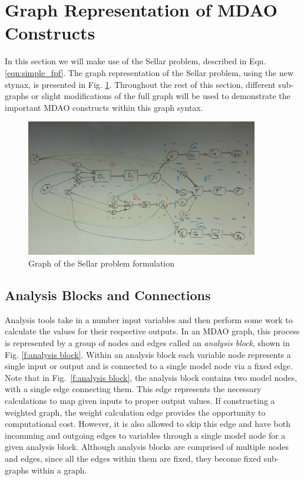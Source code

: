 \section{Graph Representation of MDAO Constructs}
\label{s:graph representation}
In this section we will make use of the Sellar problem, described in 
Eqn. \ref{eqn:simple_fpf}. The graph representation of the Sellar problem, 
using the new stynax, is presented in Fig. \ref{f:sellar_graph_full}. Throughout
the rest of this section, different sub-graphs or slight modifications of 
the full graph will be used to demonstrate the important MDAO constructs within
this graph syntax.

\begin{figure}[htb!]
    \begin{center}
    \includegraphics[width=4in]{images/sellar_graph_full}
    \end{center}
    \vspace{-10pt}
\caption{Graph of the Sellar problem formulation}
\label{f:sellar_graph_full}
\end{figure}

\subsection{Analysis Blocks and Connections}
\label{ss:analysis blocks and connections}
Analysis tools take in a number input variables and then perform some work to calculate 
the values for their respective outputs. In an MDAO graph, this process is 
represented by a group of nodes and edges called an \emph{analysis block}, 
shown in Fig. \ref{f:analysis block}. Within an analysis block each variable 
node represents a single input or output and is connected 
to a single model node via a fixed edge. Note that in Fig.~\ref{f:analysis block}, 
the analysis block contains two model nodes, with a single edge connecting them. 
This edge represents the necessary calculations to map given inputs 
to proper output values. If constructing a weighted graph, the weight calculation edge 
provides the opportunity to computational cost. However, it is also allowed to skip 
this edge and have both incomming and outgoing edges to variables through a single model 
node for a given analysis block. Although analysis blocks are comprised of multiple nodes and edges, since all 
the edges within them are fixed, they become fixed sub-graphs within a graph.

